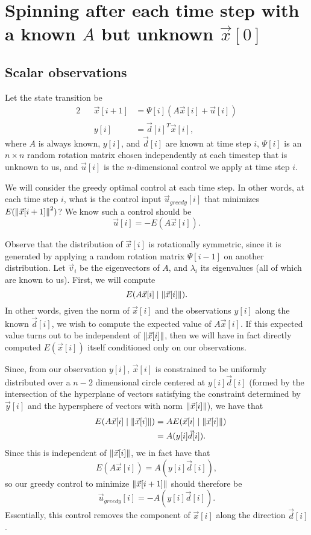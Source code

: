 \documentclass[letterpaper]{article}
\theoremstyle{remark}
\newcommand{\eqn}[1]{\begin{alignat*}{2}#1\end{alignat*}}
\begin{document}
\pagebreak
\section*{Spinning after each time step with a known $A$ but unknown $\vec{x}[0]$}
\subsection*{Scalar observations}
Let the state transition be
\eqn{
    && \vec{x}[i + 1] &= \Psi[i](A\vec{x}[i] + \vec{u}[i]) \\
    && y[i] &= \vec{d}[i]^T \vec{x}[i],
}
where $A$ is always known, $y[i]$, and $\vec{d}[i]$ are known at time step $i$, $\Psi[i]$ is an $n \times n$ random rotation matrix chosen independently at each timestep that is unknown to us, and $\vec{u}[i]$ is the $n$-dimensional control we apply at time step $i$.

We will consider the greedy optimal control at each time step. In other words, at each time step $i$, what is the control input $\vec{u}_{greedy}[i]$ that minimizes $E(\norm{\vec{x}[i + 1]}^2)$? We know such a control should be
\[
    \vec{u}[i] = -E(A\vec{x}[i]).
\]


Observe that the distribution of $\vec{x}[i]$ is rotationally symmetric, since it is generated by applying a random rotation matrix $\Psi[i - 1]$ on another distribution. Let $\vec{v}_i$ be the eigenvectors of $A$, and $\lambda_i$ its eigenvalues (all of which are known to us). First, we will compute
\[
    E(A\vec{x}[i] \mid \norm{\vec{x}[i]}).
\]
In other words, given the norm of $\vec{x}[i]$ and the observations $y[i]$ along the known $\vec{d}[i]$, we wish to compute the expected value of $A\vec{x}[i]$. If this expected value turns out to be independent of $\norm{\vec{x}[i]}$, then we will have in fact directly computed $E(\vec{x}[i])$ itself conditioned only on our observations.

Since, from our observation $y[i]$, $\vec{x}[i]$ is constrained to be uniformly distributed over a $n-2$ dimensional circle centered at $y[i]\vec{d}[i]$ (formed by the intersection of the hyperplane of vectors satisfying the constraint determined by $\vec{y}[i]$ and the hypersphere of vectors with norm $\norm{\vec{x}[i]}$), we have that
\eqn{
    && E(A\vec{x}[i] \mid \norm{\vec{x}[i]}) &= AE(\vec{x}[i] \mid \norm{\vec{x}[i]}) \\
    &&&= A(y[i]\vec{d}[i]).
}
Since this is independent of $\norm{\vec{x}[i]}$, we in fact have that
\[
    E(A\vec{x}[i]) = A(y[i]\vec{d}[i]),
\]
so our greedy control to minimize $\norm{\vec{x}[i + 1]}$ should therefore be
\[
    \vec{u}_{greedy}[i] = -A(y[i]\vec{d}[i]).
\]
Essentially, this control removes the component of $\vec{x}[i]$ along the direction $\vec{d}[i]$.
\end{document}
